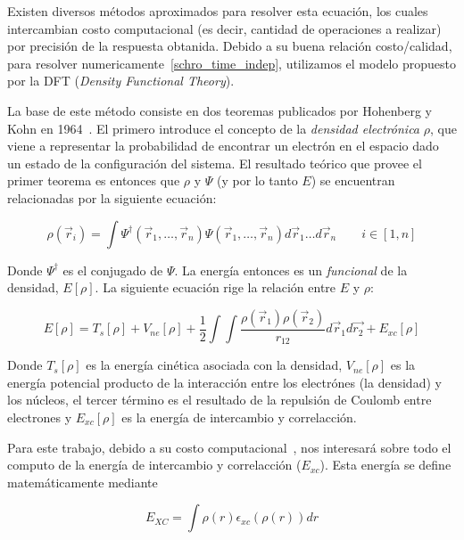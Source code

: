 Existen diversos m\'etodos aproximados para resolver esta ecuaci\'on, los cuales intercambian costo computacional (es decir, cantidad de operaciones a realizar)
por precisi\'on de la respuesta obtanida. Debido a su buena relaci\'on costo/calidad, para resolver numericamente~\ref{schro_time_indep}, utilizamos el modelo propuesto por la
DFT (\textit{Density Functional Theory}). 

La base de este m\'etodo consiste en dos teoremas publicados por Hohenberg y Kohn en 1964~\cite{HohenbergKohn}. El primero introduce el concepto de la \textit{densidad electr\'onica} $\rho$, que viene a representar la probabilidad de encontrar un electr\'on en
el espacio dado un estado de la configuraci\'on del sistema. El resultado te\'orico que provee el primer teorema es entonces que 
$\rho$ y $\Psi$ (y por lo tanto $E$) se encuentran relacionadas por la siguiente ecuaci\'on:

\begin{equation}
    \label{hohenberg_kohn}
    \rho(\vec{r}_i) = \int \Psi^{\dagger}(\vec{r}_1, \dots, \vec{r}_n) \Psi(\vec{r}_1, \dots, \vec{r}_n) d\vec{r}_1 \dots d\vec{r}_n \qquad i \in [1,n]
\end{equation}

Donde $\Psi^{\dagger}$ es el conjugado de $\Psi$. La energ\'ia entonces es un \textit{funcional} de la densidad, $E[\rho]$. 
La siguiente ecuaci\'on rige la relaci\'on entre $E$ y $\rho$:

\begin{equation}
    \label{hohenberg_kohn_energy} 
    E[\rho] = T_s[\rho] + V_{ne}[\rho] + \frac{1}{2} \int \int \frac{\rho(\vec{r}_1) \rho(\vec{r}_2)}{r_{12}} d\vec{r}_1 d\vec{r_2} + E_{xc}[\rho]
\end{equation}

Donde $T_s[\rho]$ es la energ\'ia cin\'etica asociada con la densidad, $V_{ne}[\rho]$ es la energ\'ia potencial producto de la interacci\'on entre los
electr\'ones (la densidad) y los n\'ucleos, el tercer t\'ermino es el resultado de la repulsi\'on de Coulomb entre electrones y $E_{xc}[\rho]$ es la
energ\'ia de intercambio y correlacci\'on.

Para este trabajo, debido a su costo computacional~\cite{PaperNitscheManu}, nos interesar\'a sobre todo el computo de la energ\'ia de intercambio y correlacci\'on ($E_{xc}$).
Esta energ\'ia se define matem\'aticamente mediante

\begin{equation}
    E_{XC} = \int \rho(r) \epsilon_{xc}\left( \rho(r) \right ) dr
\end{equation}

